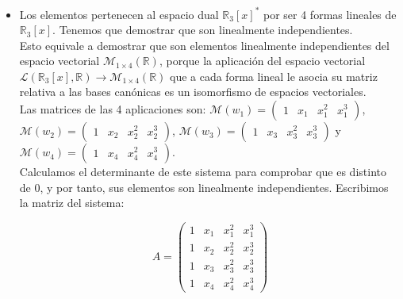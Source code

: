 \begin{itemize}[$\bullet$]
    \item

    Los elementos \myvectors pertenecen al espacio dual $\mathbb{R}_3[x]^*$ por ser 4 formas lineales de $\mathbb{R}_3[x]$. Tenemos que demostrar que son linealmente independientes.\\

    Esto equivale a demostrar que \myvectors son elementos linealmente independientes del espacio vectorial $\mathcal{M}_{1\times4}(\mathbb{R})$, porque la aplicación del espacio vectorial $\mathcal{L}(\mathbb{R}_3[x], \mathbb{R}) \longrightarrow \mathcal{M}_{1\times4}(\mathbb{R})$ que a cada forma lineal le asocia su
    matriz relativa a las bases canónicas es un isomorfismo de espacios vectoriales.\\

    Las matrices de las 4 aplicaciones son:
    $\mathcal{M}(w_1) =
    \begin{pmatrix}
        1 & x_1 & x_1^2 & x_1^3
    \end{pmatrix}$,
    $\mathcal{M}(w_2) =
    \begin{pmatrix}
        1 & x_2 & x_2^2 & x_2^3
    \end{pmatrix}$,
    $\mathcal{M}(w_3) =
    \begin{pmatrix}
        1 & x_3 & x_3^2 & x_3^3
    \end{pmatrix}$ y
    $\mathcal{M}(w_4) =
    \begin{pmatrix}
        1 & x_4 & x_4^2 & x_4^3
    \end{pmatrix}$.\\

    Calculamos el determinante de este sistema para comprobar que es distinto de $0$, y por tanto, sus elementos son linealmente independientes. Escribimos la matriz del sistema:

    \begin{equation*}
        A = \begin{pmatrix}
                1 & x_1 & x_1^2 & x_1^3 \\[6pt]
                1 & x_2 & x_2^2 & x_2^3 \\[6pt]
                1 & x_3 & x_3^2 & x_3^3 \\[6pt]
                1 & x_4 & x_4^2 & x_4^3
        \end{pmatrix}
    \end{equation*}\\


\end{itemize}
